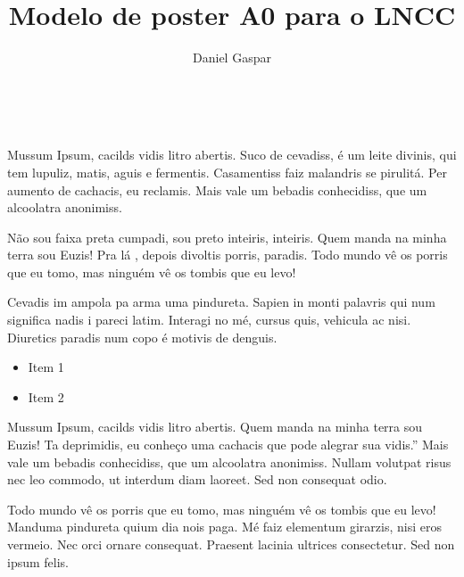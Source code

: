 \documentclass[portrait,a0]{a0poster}
\begin{document}
	
\renewcommand\refname{\textcolor{CorTitulo}{Referências}}


\title{Modelo de poster A0 para o LNCC}
\author{Daniel Gaspar}
\address{Laboratório Nacional de Computação Científica (LNCC), Petrópolis, RJ}

\makeheader ~ \\

\begin{multicols}{2}   %
	




Mussum Ipsum, cacilds vidis litro abertis. Suco de cevadiss, é um leite divinis, qui tem lupuliz, matis, aguis e fermentis. Casamentiss faiz malandris se pirulitá. Per aumento de cachacis, eu reclamis. Mais vale um bebadis conhecidiss, que um alcoolatra anonimiss.

Não sou faixa preta cumpadi, sou preto inteiris, inteiris. Quem manda na minha terra sou Euzis! Pra lá , depois divoltis porris, paradis. Todo mundo vê os porris que eu tomo, mas ninguém vê os tombis que eu levo!

Cevadis im ampola pa arma uma pindureta. Sapien in monti palavris qui num significa nadis i pareci latim. Interagi no mé, cursus quis, vehicula ac nisi. Diuretics paradis num copo é motivis de denguis.

\begin{itemize}
	\item Item 1
	\item Item 2
\end{itemize} 


Mussum Ipsum, cacilds vidis litro abertis. Quem manda na minha terra sou Euzis! Ta deprimidis, eu conheço uma cachacis que pode alegrar sua vidis.” Mais vale um bebadis conhecidiss, que um alcoolatra anonimiss. Nullam volutpat risus nec leo commodo, ut interdum diam laoreet. Sed non consequat odio.

Todo mundo vê os porris que eu tomo, mas ninguém vê os tombis que eu levo! Manduma pindureta quium dia nois paga. Mé faiz elementum girarzis, nisi eros vermeio. Nec orci ornare consequat. Praesent lacinia ultrices consectetur. Sed non ipsum felis.


\end{multicols}
\end{document}
